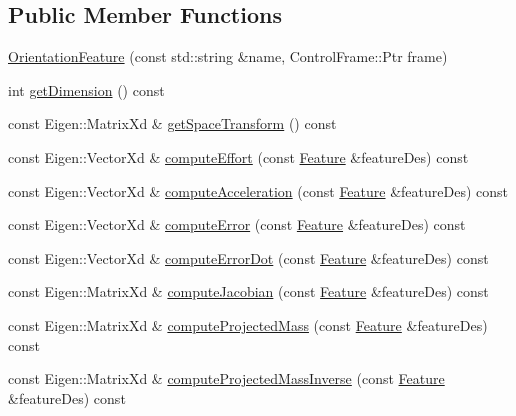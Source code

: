 \subsection*{Public Member Functions}
\begin{DoxyCompactItemize}
\item 
\hyperlink{classocra_1_1OrientationFeature_acea2f5647dd31094ff4e83a77a89fdd8}{Orientation\+Feature} (const std\+::string \&name, Control\+Frame\+::\+Ptr frame)
\item 
int \hyperlink{classocra_1_1OrientationFeature_a20e61cf1de83429db026d162fc5d459e}{get\+Dimension} () const
\item 
const Eigen\+::\+Matrix\+Xd \& \hyperlink{classocra_1_1OrientationFeature_ae820bfe2017c670eac6717fda7408c67}{get\+Space\+Transform} () const
\item 
const Eigen\+::\+Vector\+Xd \& \hyperlink{classocra_1_1OrientationFeature_a3aef6b9e83419882a81792804d8da00e}{compute\+Effort} (const \hyperlink{classocra_1_1Feature}{Feature} \&feature\+Des) const
\item 
const Eigen\+::\+Vector\+Xd \& \hyperlink{classocra_1_1OrientationFeature_af5ccb1a3d72b23bc0498c357303fe0e2}{compute\+Acceleration} (const \hyperlink{classocra_1_1Feature}{Feature} \&feature\+Des) const
\item 
const Eigen\+::\+Vector\+Xd \& \hyperlink{classocra_1_1OrientationFeature_a013b77e19c995ce9eaf8b76463b8edc7}{compute\+Error} (const \hyperlink{classocra_1_1Feature}{Feature} \&feature\+Des) const
\item 
const Eigen\+::\+Vector\+Xd \& \hyperlink{classocra_1_1OrientationFeature_a49fd73d3b8dd5eb2f26c32c3c4440644}{compute\+Error\+Dot} (const \hyperlink{classocra_1_1Feature}{Feature} \&feature\+Des) const
\item 
const Eigen\+::\+Matrix\+Xd \& \hyperlink{classocra_1_1OrientationFeature_a14327a30bae8c06ea241aeeb19a48631}{compute\+Jacobian} (const \hyperlink{classocra_1_1Feature}{Feature} \&feature\+Des) const
\item 
const Eigen\+::\+Matrix\+Xd \& \hyperlink{classocra_1_1OrientationFeature_ae30a255a7e0edf9704c0c8e2dbd5447f}{compute\+Projected\+Mass} (const \hyperlink{classocra_1_1Feature}{Feature} \&feature\+Des) const
\item 
const Eigen\+::\+Matrix\+Xd \& \hyperlink{classocra_1_1OrientationFeature_ae5b32433e22fcea36c62b13811f8b5a0}{compute\+Projected\+Mass\+Inverse} (const \hyperlink{classocra_1_1Feature}{Feature} \&feature\+Des) const
\item 

\end{DoxyCompactItemize}
